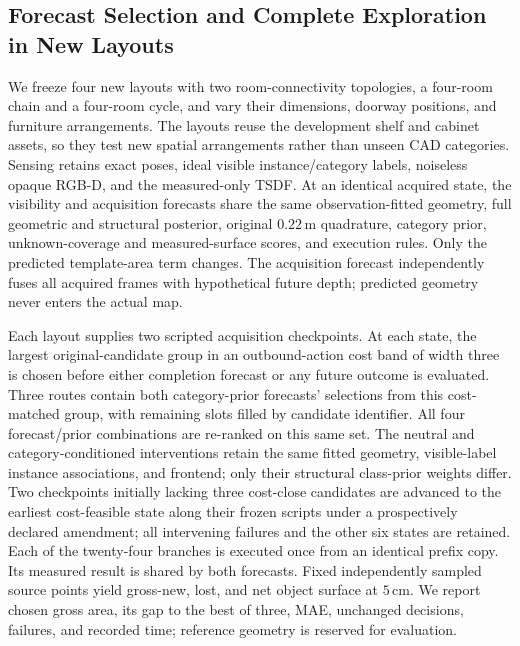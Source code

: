 \subsection{Forecast Selection and Complete Exploration in New Layouts}
We freeze four new layouts with two room-connectivity topologies, a four-room chain and a four-room cycle, and vary their dimensions, doorway positions, and furniture arrangements. The layouts reuse the development shelf and cabinet assets, so they test new spatial arrangements rather than unseen CAD categories. Sensing retains exact poses, ideal visible instance/category labels, noiseless opaque RGB-D, and the measured-only TSDF. At an identical acquired state, the visibility and acquisition forecasts share the same observation-fitted geometry, full geometric and structural posterior, original $0.22\,$m quadrature, category prior, unknown-coverage and measured-surface scores, and execution rules. Only the predicted template-area term changes. The acquisition forecast independently fuses all acquired frames with hypothetical future depth; predicted geometry never enters the actual map.

Each layout supplies two scripted acquisition checkpoints. At each state, the largest original-candidate group in an outbound-action cost band of width three is chosen before either completion forecast or any future outcome is evaluated. Three routes contain both category-prior forecasts' selections from this cost-matched group, with remaining slots filled by candidate identifier. All four forecast/prior combinations are re-ranked on this same set. The neutral and category-conditioned interventions retain the same fitted geometry, visible-label instance associations, and frontend; only their structural class-prior weights differ. Two checkpoints initially lacking three cost-close candidates are advanced to the earliest cost-feasible state along their frozen scripts under a prospectively declared amendment; all intervening failures and the other six states are retained. Each of the twenty-four branches is executed once from an identical prefix copy. Its measured result is shared by both forecasts. Fixed independently sampled source points yield gross-new, lost, and net object surface at $5\,$cm. We report chosen gross area, its gap to the best of three, MAE, unchanged decisions, failures, and recorded time; reference geometry is reserved for evaluation.

